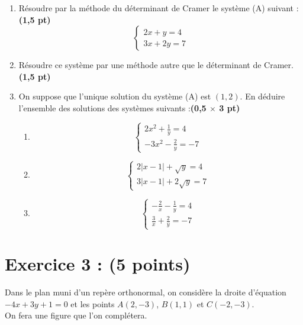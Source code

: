 \documentclass{article}
\begin{document}
\begin{enumerate}
    \item Résoudre par la méthode du déterminant de Cramer le système (A) suivant :\textbf{(1,5 pt)}
    \[
    \begin{cases}
    2x + y = 4 \\
    3x + 2y = 7
    \end{cases}
    \]

    \item Résoudre ce système par une méthode autre que le déterminant de Cramer.\textbf{(1,5 pt)}

    \item On suppose que l’unique solution du système (A) est \((1, 2)\). En déduire l’ensemble des solutions des systèmes suivants :\textbf{(0,5 $\times$ 3 pt)}
    \begin{enumerate}
        \item 
        \[
        \begin{cases}
        2x^2 + \frac{1}{y} = 4 \\
        -3x^2 - \frac{2}{y} = -7
        \end{cases}
        \]
        
        \item 
        \[
        \begin{cases}
        2|x - 1| + \sqrt{y} = 4 \\
        3|x - 1| + 2\sqrt{y} = 7
        \end{cases}
        \]
        
        \item 
        \[
        \begin{cases}
        -\frac{2}{x} - \frac{1}{y} = 4 \\
        \frac{3}{x} + \frac{2}{y} = -7
        \end{cases}
        \]
    \end{enumerate}
\end{enumerate}
\section*{Exercice 3 : (5 points)}

Dans le plan muni d’un repère orthonormal, on considère la droite d’équation \(-4x + 3y + 1 = 0\) et les points \(A(2, -3)\), \(B(1, 1)\) et \(C(-2, -3)\).\\
On fera une figure que l’on complétera.
\end{document}
